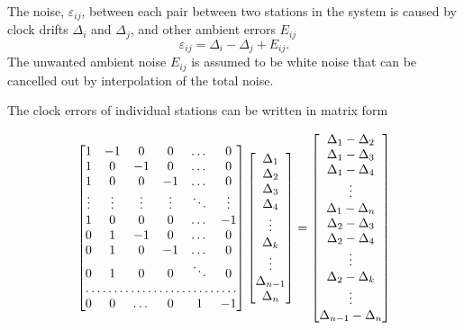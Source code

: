 \documentclass[12pt, sumlimits, intlimits]{article}
\begin{document}
The noise, $\varepsilon_{ij}$, between each pair between two stations in the system is caused by clock drifts $\Delta_i$ and $\Delta_j$, and other ambient errors $E_{ij}$
\begin{equation}
\varepsilon_{ij} =  \Delta_i - \Delta_j  + E_{ij}.
\end{equation}
The unwanted ambient noise $E_{ij}$ is assumed to be white noise that can be cancelled out by interpolation of the total noise.


The clock errors of individual stations can be written in matrix form 

\begin{equation*}
\begin{bmatrix}
1 & -1 & 0 & 0 & \dots  & 0 \\
1 & 0 & -1 & 0 & \dots  & 0 \\
1 &  0  & 0 & -1 & \dots   & 0 \\
\vdots & \vdots & \vdots  & \vdots & \ddots & \vdots \\
1 &  0  & 0 & 0 & \dots & -1 \\
0 &  1  & -1 & 0 & \dots & 0 \\
0 & 1 & 0 & -1 & \dots & 0 \\
0 & 1 & 0 & 0 & \ddots & 0 \\
\hdotsfor{6} \\
0 & 0 & \dots & 0& 1 & -1
\end{bmatrix}
\begin{bmatrix}
\Delta_1 \\ \Delta_2 \\ \Delta_3 \\ \Delta_4 \\ \vdots \\ \Delta_k \\ \vdots \\ \Delta_{n-1} \\ \Delta_n
\end{bmatrix}
= 
\begin{bmatrix}
\Delta_1 - \Delta_2 \\ \Delta_1-\Delta_3 \\ \Delta_1-\Delta_4 \\ \vdots \\ \Delta_1 - \Delta_{n} \\ \Delta_2- \Delta_3 \\ \Delta_2 - \Delta_4 \\ \vdots  \\ \Delta_2-\Delta_k \\ \vdots \\ \Delta_{n-1} - \Delta_n

\end{bmatrix}
\end{equation*}
\end{document}
